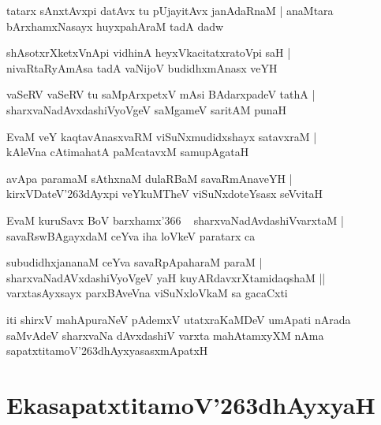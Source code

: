 \documentclass[twoside,12pt,openright]{book}
\def\S{\char'263}
\newcounter{shloka}[chapter]
\begin{document}
\begin{shloka}%
tatarx sAnxtAvxpi datAvx tu pUjayitAvx janAdaRnaM |
anaMtara bArxhamxNasayx huyxpahAraM tadA dadw
\end{shloka}

\begin{shloka}%
shAsotxrXketxVnApi vidhinA heyxVkacitatxratoVpi saH |\\
nivaRtaRyAmAsa tadA vaNijoV budidhxmAnasx veYH 
\end{shloka}

\begin{shloka}%
vaSeRV vaSeRV tu saMpArxpetxV mAsi BAdarxpadeV tathA |\\
sharxvaNadAvxdashiVyoVgeV saMgameV saritAM punaH 
\end{shloka}

\begin{shloka}%
EvaM veY kaqtavAnasxvaRM viSuNxmudidxshayx satavxraM |\\
kAleVna cAtimahatA paMcatavxM samupAgataH 
\end{shloka}

\begin{shloka}%
avApa paramaM sAthxnaM dulaRBaM savaRmAnaveYH |\\
kirxVDateV\S dAyxpi veYkuMTheV viSuNxdoteYsasx seVvitaH
\end{shloka}

\begin{shloka}%
EvaM kuruSavx BoV barxhamx\char'366 ~ sharxvaNadAvdashiVvarxtaM |\\
savaRswBAgayxdaM ceYva iha loVkeV paratarx ca 
\end{shloka}

\begin{shloka}%
subudidhxjananaM ceYva savaRpApaharaM paraM |\\
sharxvaNadAVxdashiVyoVgeV yaH kuyARdavxrXtamidaqshaM ||\\
varxtasAyxsayx parxBAveVna viSuNxloVkaM sa gacaCxti 
\end{shloka}

\begin{center}
iti shirxV mahApuraNeV pAdemxV utatxraKaMDeV umApati nArada saMvAdeV sharxvaNa dAvxdashiV varxta 
mahAtamxyXM nAma sapatxtitamoV\S dhAyxyasasxmApatxH 
\end{center}

\chapter{EkasapatxtitamoV\S dhAyxyaH}
\end{document}
